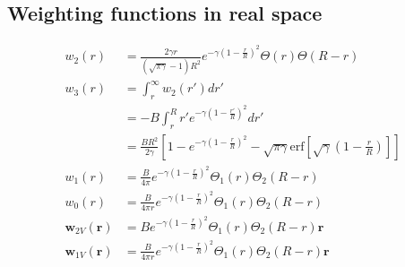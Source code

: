 \documentclass[letterpaper,twocolumn,amsmath,amssymb,prb]{revtex4-1}
\newcommand{\red}[1]{{\bf \color{red} #1}}
\newcommand{\rr}{\textbf{r}}
\newcommand{\fixme}[1]{\red{[#1]}}
\begin{document}

\subsection{Weighting functions in real space}

\begin{align}
  w_2(r) &=\frac{2\gamma r}
  {(\sqrt{\pi \gamma}-1)R^2}e^{-\gamma \left ( 1 - \frac{r}{R} \right)^2}
           \Theta(r) \Theta(R - r )\\
  w_3(r) &= \int_r^\infty w_2(r') dr'\\
         &= -B \int_r^R r' e^{-\gamma \left(1- \frac{r'}{R} \right)^2}dr'\\
         &= \frac{B R^2}{2\gamma}\left[ 1 - e^{-\gamma
      \left(1-\frac{r}{R} \right)^2} - \sqrt{\pi \gamma} \mathrm{erf} \left[
        \sqrt{\gamma} \left( 1- \frac{r}{R} \right) \right] \right]\\
  w_1(r) &= \frac{B}{4\pi}e^{-\gamma \left ( 1 - \frac{r}{R}
            \right)^2} \Theta_1(r) \Theta_2 (R - r)\\
  w_0(r) &= \frac{B}{4\pi r}e^{-\gamma \left ( 1 - \frac{r}{R}
            \right)^2} \Theta_1(r) \Theta_2 (R - r)\\
  \mathbf{w}_{2V}(\rr) &= B e^{-\gamma \left ( 1 - \frac{r}{R} \right)^2}
           \Theta_1(r) \Theta_2 (R - r) \rr\\
  \mathbf{w}_{1V}(\rr) &= \frac{B}{4\pi r} e^{-\gamma \left ( 1 - \frac{r}{R} \right)^2}
           \Theta_1(r) \Theta_2 (R - r )\rr
\end{align}
\end{document}
